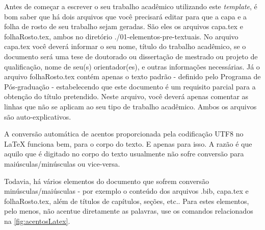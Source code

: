 Antes de começar a escrever o seu trabalho acadêmico utilizando este \emph{template}, é bom saber que há dois arquivos que você precisará editar para que a capa e a folha de rosto de seu trabalho sejam geradas. São eles os arquivos {\ttfamily capa.tex} e {\ttfamily folhaRosto.tex}, ambos no diretório  {\ttfamily ./01-elementos-pre-textuais}. No arquivo {\ttfamily capa.tex} você deverá informar o seu nome, título do trabalho acadêmico, se o documento será uma tese de doutorado ou dissertação de mestrado ou projeto de qualificação, nome de seu(s) orientador(es), e outras informações necessárias. Já o arquivo {\ttfamily folhaRosto.tex} contém apenas o texto padrão - definido pelo Programa de Pós-graduação - estabelecendo que este documento é um requisito parcial para a obtenção do título pretendido. Neste arquivo, você deverá apenas comentar as linhas que não se aplicam ao seu tipo de trabalho acadêmico. Ambos os arquivos são auto-explicativos.

A conversão automática de acentos proporcionada pela codificação UTF8 no \LaTeX{} funciona bem, para o corpo do texto. E apenas para isso. A razão é que aquilo que é digitado no corpo do texto usualmente não sofre conversão para maiúsculas/minúsculas ou vice-versa.

Todavia, há vários elementos do documento que sofrem conversão minúsculas/maiúsculas - por exemplo o conteúdo dos arquivos {\ttfamily .bib}, {\ttfamily capa.tex} e {\ttfamily folhaRosto.tex}, além de títulos de capítulos, seções, etc.. Para estes elementos, pelo menos, não acentue diretamente as palavras, use os comandos relacionados na \autoref{fig:acentosLatex}.


